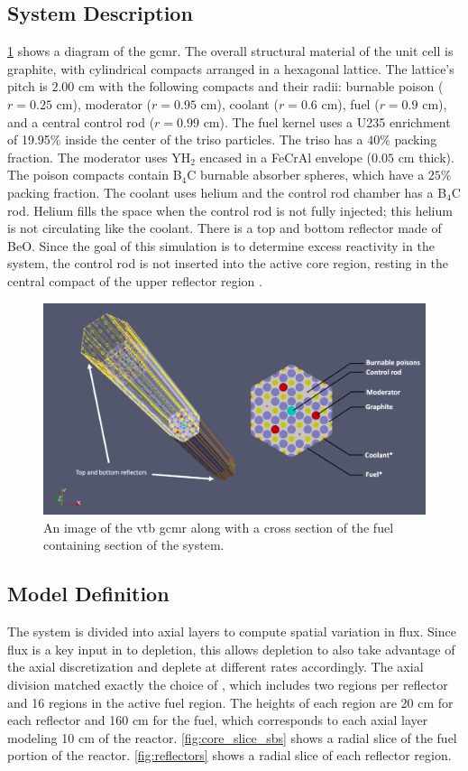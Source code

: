 \documentclass[letterpaper]{physor2024}
\begin{document}
\subsection{System Description}\label{sec:system}
 \cref{fig:vtb_gcmr} shows a diagram of the \gls{gcmr}. The overall structural material of the unit cell is graphite, with cylindrical compacts arranged in a hexagonal lattice. The lattice's pitch is $2.00$ cm with the following compacts and their radii: burnable poison ($r=0.25$ cm), moderator ($r=0.95$ cm), coolant ($r=0.6$ cm), fuel ($r=0.9$ cm), and a central control rod ($r=0.99$ cm). The fuel kernel uses a U235 enrichment of 19.95\% inside the center of the \gls{triso} particles. The \gls{triso} has a $40\%$ packing fraction. The moderator uses YH$_{2}$ encased in a FeCrAl envelope ($0.05$ cm thick). The poison compacts contain B$_{4}$C burnable absorber spheres, which have a $25\%$ packing fraction. The coolant uses helium and the control rod chamber has a B$_{4}$C rod. Helium fills the space when the control rod is not fully injected; this helium is not circulating like the coolant. There is a top and bottom reflector made of BeO. Since the goal of this simulation is to determine excess reactivity in the system, the control rod is not inserted into the active core region, resting in the central compact of the upper reflector region \cite{Abdelhameed-ANS-2022}.
\begin{figure}[h!]
    \centering
    \includegraphics[width=0.9\linewidth]{figures/vtb_gcmr_diagram.jpg}
    \caption{An image of the \gls{vtb} \gls{gcmr} along with a cross section of the fuel containing section of the system.}
    \label{fig:vtb_gcmr}
\end{figure}

\subsection{Model Definition}\label{sec:model_def}
The system is divided into axial layers to compute spatial variation in flux. Since flux is a key input in to depletion, this allows depletion to also take advantage of the axial discretization and deplete at different rates accordingly. The axial division matched exactly the choice of \cite{Abdelhameed-ANS-2022}, which includes two regions per reflector and 16 regions in the active fuel region. The heights of each region are 20 cm for each reflector and 160 cm for the fuel, which corresponds to each axial layer modeling 10 cm of the reactor. \cref{fig:core_slice_sbs} shows a radial slice of the fuel portion of the reactor. \cref{fig:reflectors} shows a radial slice of each reflector region.
\end{document}
